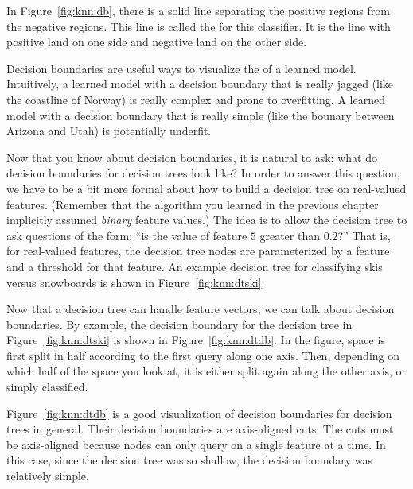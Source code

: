 In Figure~\ref{fig:knn:db}, there is a solid line separating the positive
regions from the negative regions.  This line is called the
 for this classifier.  It is the line with
positive land on one side and negative land on the other side.


Decision boundaries are useful ways to visualize the
 of a learned model.  Intuitively, a learned model
with a decision boundary that is really jagged (like the coastline of
Norway) is really complex and prone to overfitting.  A learned model
with a decision boundary that is really simple (like the bounary
between Arizona and Utah) is potentially underfit.

Now that you know about decision boundaries, it is natural to ask:
what do decision boundaries for decision trees look like?  In order to
answer this question, we have to be a bit more formal about how to
build a decision tree on real-valued features.  (Remember that the
algorithm you learned in the previous chapter implicitly assumed
\emph{binary} feature values.)  The idea is to allow the decision tree
to ask questions of the form: ``is the value of feature $5$ greater
than $0.2$?''  That is, for real-valued features, the decision tree
nodes are parameterized by a feature and a threshold for that
feature.  An example decision tree for classifying skis versus
snowboards is shown in Figure~\ref{fig:knn:dtski}.



Now that a decision tree can handle feature vectors, we can talk about
decision boundaries.  By example, the decision boundary for the
decision tree in Figure~\ref{fig:knn:dtski} is shown in
Figure~\ref{fig:knn:dtdb}.  In the figure, space is first split in half
according to the first query along one axis.  Then, depending on which
half of the space you look at, it is either split again along the
other axis, or simply classified.


Figure~\ref{fig:knn:dtdb} is a good visualization of decision boundaries
for decision trees in general.  Their decision boundaries are
axis-aligned cuts.  The cuts must be axis-aligned because nodes can
only query on a single feature at a time.  In this case, since the
decision tree was so shallow, the decision boundary was relatively
simple.

